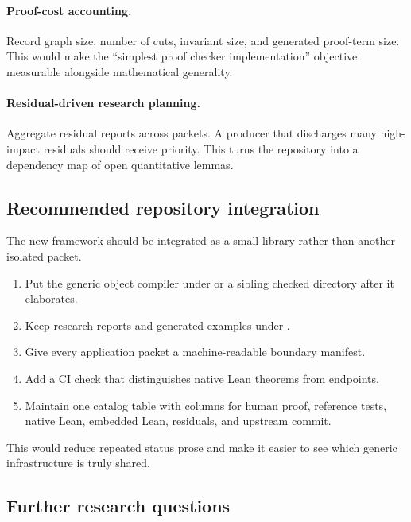 \paragraph{Proof-cost accounting.}
Record graph size, number of cuts, invariant size, and generated proof-term size.  This would make the ``simplest proof checker implementation'' objective measurable alongside mathematical generality.

\paragraph{Residual-driven research planning.}
Aggregate residual reports across packets.  A producer that discharges many high-impact residuals should receive priority.  This turns the repository into a dependency map of open quantitative lemmas.

\subsection{Recommended repository integration}

The new framework should be integrated as a small library rather than another isolated packet.

\begin{enumerate}
\item Put the generic object compiler under  or a sibling checked directory after it elaborates.
\item Keep research reports and generated examples under .
\item Give every application packet a machine-readable boundary manifest.
\item Add a CI check that distinguishes native Lean theorems from  endpoints.
\item Maintain one catalog table with columns for human proof, reference tests, native Lean, embedded Lean, residuals, and upstream commit.
\end{enumerate}

This would reduce repeated status prose and make it easier to see which generic infrastructure is truly shared.

\subsection{Further research questions}

